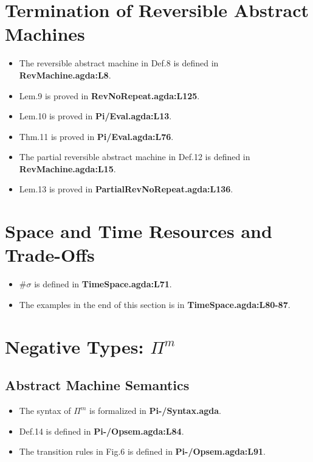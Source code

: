 \documentclass{article}
\begin{document}
\section{Termination of Reversible Abstract Machines}
\begin{itemize}
\item The reversible abstract machine in Def.8 is defined in \textbf{RevMachine.agda:L8}.
\item Lem.9 is proved in \textbf{RevNoRepeat.agda:L125}.
\item Lem.10 is proved in \textbf{Pi/Eval.agda:L13}.
\item Thm.11 is proved in \textbf{Pi/Eval.agda:L76}.
\item The partial reversible abstract machine in Def.12 is defined in \textbf{RevMachine.agda:L15}.
\item Lem.13 is proved in \textbf{PartialRevNoRepeat.agda:L136}.
\end{itemize}

\section{Space and Time Resources and Trade-Offs}
\begin{itemize}
\item $\# \sigma$ is defined in \textbf{TimeSpace.agda:L71}.
\item The examples in the end of this section is in \textbf{TimeSpace.agda:L80-87}.
\end{itemize}

\section{Negative Types: $\Pi^m$}
\subsection{Abstract Machine Semantics}
\begin{itemize}
\item The syntax of $\Pi^m$ is formalized in \textbf{Pi-/Syntax.agda}.
\item Def.14 is defined in \textbf{Pi-/Opsem.agda:L84}.
\item The transition rules in Fig.6 is defined in \textbf{Pi-/Opsem.agda:L91}.
\end{itemize}
\end{document}
